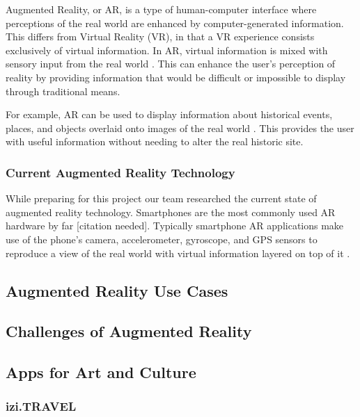 \documentclass[a4paper, 10pt, american]{article}
\begin{document}
Augmented Reality, or AR, is a type of human-computer interface where
perceptions of the real world are enhanced by computer-generated information.
This differs from Virtual Reality (VR), in that a VR experience consists
exclusively of virtual information. In AR, virtual information is mixed with
sensory input from the real world \autocite{carmigniani2011}. This can enhance
the user's perception of reality by providing information that would be
difficult or impossible to display through traditional means.

For example, AR can be used to display information about historical events,
places, and objects overlaid onto images of the real world
\autocite{saenz2009}.  This provides the user with useful information without
needing to alter the real historic site.

\subsubsection{Current Augmented Reality Technology}
\label{sec:currentAugmentedRealityTechnology}

While preparing for this project our team researched the current state of
augmented reality technology. Smartphones are the most commonly used AR
hardware by far [citation needed]. Typically smartphone AR applications make
use of the phone's camera, accelerometer, gyroscope, and GPS sensors to
reproduce a view of the real world with virtual information layered on top of
it \autocite{bonsor2018}.

\subsection{Augmented Reality Use Cases}
\label{sec:augmentedRealityUseCases}

\lipsum[1]

\subsection{Challenges of Augmented Reality}
\label{sec:challengesOfAugmentedReality}

\lipsum[1]

\subsection{Apps for Art and Culture}
\label{sec:appsForArtAndCulture}

\lipsum[2-3]

\subsubsection{izi.TRAVEL}
\label{sec:iziTravel}
\end{document}
